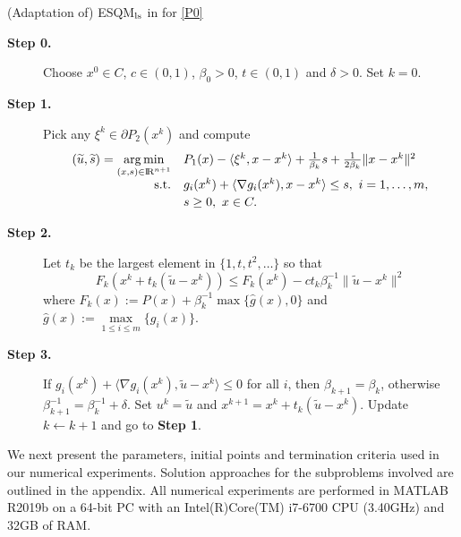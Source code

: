 \documentclass[10pt]{article}
\numberwithin{equation}{section}
\def\R{{\rm I\!R}}
\def\argmin{\mathop{\rm arg\,min}}
\begin{document}
\begin{algorithm}
\caption{(Adaptation of) ESQM$_{\rm ls}$ in \cite{Au13} for \eqref{P0}}\label{ESQM}
\begin{algorithmic}
\STATE
\begin{description}
  \item[\bf Step 0.] Choose $x^0\in C$, $c \in (0, 1)$, $\beta_0 > 0$, $t\in(0, 1)$ and $\delta > 0$. Set $k = 0$.
  \item[\bf Step 1.] Pick any $\xi^k\in\partial P_2(x^k)$ and compute
  \begin{equation}\label{subproblemhaha}
  \begin{array}{rl}
  (\widetilde u,\widetilde s) = \argmin\limits_{(x,s)\in\R^{n+1}} & P_1(x) -\langle \xi^k, x - x^k\rangle + \frac{1}{\beta_k} s + \frac{1}{2\beta_k}\|x - x^k\|^2\\ [2pt]
      {\rm s.t.}& g_i(x^k) + \langle \nabla g_i(x^k), x - x^k\rangle \leq s,\ i = 1, \ldots, m,\\ [2pt]
      & s \geq 0,\ x\in C.
  \end{array}
  \end{equation}

  \item[\bf Step 2.] Let $t_k$ be the largest element in $\{1, t, t^2, \ldots\}$ so that
  \begin{equation*}
    F_k(x^k + t_k (\widetilde{u} - x^k)) \le F_k(x^k) - c t_k \beta_k^{-1} \|\widetilde{u} - x^k\|^2
  \end{equation*}
  where $F_k(x):= P(x) + \beta^{-1}_k \max\{\widehat g(x),0\}$ and $\widehat g(x) := \max\limits_{1\le i\le m}\{g_i(x)\}$.

  \item[\bf Step 3.] If $g_i(x^k) + \langle \nabla g_i(x^k), \widetilde{u} - x^k\rangle \leq 0$ for all $i$, then $\beta_{k+1} = \beta_k$, otherwise $\beta_{k+1}^{-1} = \beta_k^{-1} + \delta$. Set $u^k = \widetilde u$ and $x^{k+1} = x^k + t_k (\widetilde{u} - x^k)$. Update $k \leftarrow k+1$ and go to \textbf{Step 1}.
\end{description}
\end{algorithmic}
\end{algorithm}

We next present the parameters, initial points and termination criteria used in our numerical experiments. Solution approaches for the subproblems involved are outlined in the appendix. All numerical experiments are performed in MATLAB R2019b on a 64-bit PC with an Intel(R)Core(TM) i7-6700 CPU (3.40GHz) and 32GB of RAM.
\end{document}
